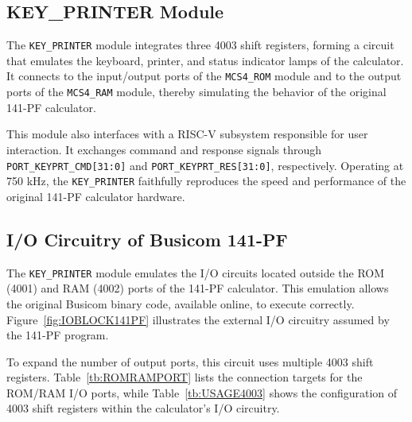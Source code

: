 \subsection{KEY\_PRINTER Module}
The \texttt{KEY\_PRINTER} module integrates three 4003 shift registers, forming a circuit that emulates the keyboard, printer, and status indicator lamps of the calculator. It connects to the input/output ports of the \texttt{MCS4\_ROM} module and to the output ports of the \texttt{MCS4\_RAM} module, thereby simulating the behavior of the original 141-PF calculator.

This module also interfaces with a RISC-V subsystem responsible for user interaction. It exchanges command and response signals through \texttt{PORT\_KEYPRT\_CMD[31:0]} and \texttt{PORT\_KEYPRT\_RES[31:0]}, respectively. Operating at 750 kHz, the \texttt{KEY\_PRINTER} faithfully reproduces the speed and performance of the original 141-PF calculator hardware.

\subsection{I/O Circuitry of Busicom 141-PF}
The \texttt{KEY\_PRINTER} module emulates the I/O circuits located outside the ROM (4001) and RAM (4002) ports of the 141-PF calculator. This emulation allows the original Busicom binary code, available online, to execute correctly. Figure~\ref{fig:IOBLOCK141PF} illustrates the external I/O circuitry assumed by the 141-PF program.

To expand the number of output ports, this circuit uses multiple 4003 shift registers. Table~\ref{tb:ROMRAMPORT} lists the connection targets for the ROM/RAM I/O ports, while Table~\ref{tb:USAGE4003} shows the configuration of 4003 shift registers within the calculator’s I/O circuitry.

